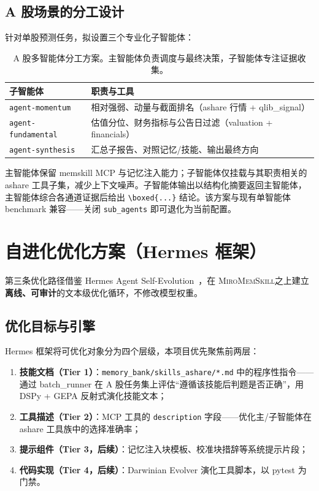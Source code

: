 \documentclass[11pt]{article}
\newcommand{\system}{\textsc{MiroMemSkill}}
\begin{document}
\subsection{A 股场景的分工设计}

针对单股预测任务，拟设置三个专业化子智能体：
\begin{table}[t]
\centering
\small
\begin{tabular}{@{}lp{}@{}}
\toprule
\textbf{子智能体} & \textbf{职责与工具} \\
\midrule
\texttt{agent-momentum} & 相对强弱、动量与截面排名（ashare 行情 + qlib\_signal） \\
\texttt{agent-fundamental} & 估值分位、财务指标与公告日过滤（valuation + financials） \\
\texttt{agent-synthesis} & 汇总子报告、对照记忆/技能、输出最终方向 \\
\bottomrule
\end{tabular}
\caption{A 股多智能体分工方案。主智能体负责调度与最终决策，子智能体专注证据收集。}
\label{tab:multiagent}
\end{table}

主智能体保留 memskill MCP 与记忆注入能力；子智能体仅挂载与其职责相关的 ashare 工具子集，减少上下文噪声。子智能体输出以结构化摘要返回主智能体，主智能体综合各通道证据后给出 \texttt{\textbackslash boxed\{...\}} 结论。该方案与现有单智能体 benchmark 兼容——关闭 \texttt{sub\_agents} 即可退化为当前配置。

\section{自进化优化方案（Hermes 框架）}

第三条优化路径借鉴 Hermes Agent Self-Evolution~\citep{hermes2025}，在 \system 之上建立\textbf{离线、可审计}的文本级优化循环，不修改模型权重。

\subsection{优化目标与引擎}

Hermes 框架将可优化对象分为四个层级，本项目优先聚焦前两层：
\begin{enumerate}
    \item \textbf{技能文档（Tier 1）}：\texttt{memory\_bank/skills\_ashare/*.md} 中的程序性指令——通过 batch\_runner 在 A 股任务集上评估“遵循该技能后判题是否正确”，用 DSPy + GEPA 反射式演化技能文本；
    \item \textbf{工具描述（Tier 2）}：MCP 工具的 \texttt{description} 字段——优化主/子智能体在 ashare 工具族中的选择准确率；
    \item \textbf{提示组件（Tier 3，后续）}：记忆注入块模板、校准块措辞等系统提示片段；
    \item \textbf{代码实现（Tier 4，后续）}：Darwinian Evolver 演化工具脚本，以 pytest 为门禁。
\end{enumerate}
\end{document}
